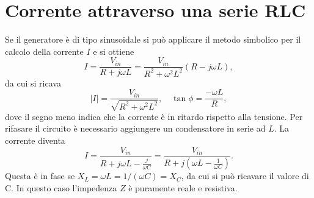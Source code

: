 \section{Corrente attraverso una serie RLC}
Se il generatore è di tipo sinusoidale si può applicare il metodo simbolico per il calcolo della corrente $I$ e si ottiene
\begin{equation}
  I = \frac{V_{in}}{R + j\omega L} = \frac{V_{in}}{R^2 + \omega^2 L^2}(R - j \omega L),
\end{equation}
da cui si ricava
\begin{equation}
    |I| = \frac{V_{in}}{\sqrt{R^2 + \omega^2 L^2}},\quad\tan{\phi}=\frac{-\omega L}{R},
\end{equation}
dove il segno meno indica che la corrente è in ritardo rispetto alla tensione. Per rifasare il circuito è necessario aggiungere un condensatore in serie ad $L$. La corrente diventa
\begin{equation}
I = \frac{V_{in}}{R + j\omega L - \frac{j}{\omega C}} = \frac{V_{in}}{R + j\left( \omega L - \frac{1}{\omega C} \right)}.
\end{equation}
Questa è in fase se $X_L=\omega L=1/(\omega C)=X_C$, da cui si può ricavare il valore di C. In questo caso l'impedenza $Z$ è puramente reale e resistiva.